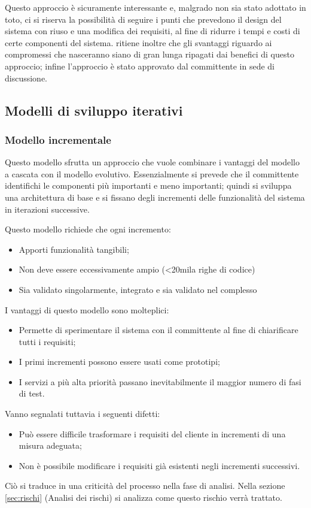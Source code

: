 Questo approccio è sicuramente interessante e, malgrado non sia stato adottato in toto, ci si riserva la possibilità di seguire i punti che prevedono il design del sistema con riuso e una modifica dei requisiti, al fine di ridurre i tempi e costi di certe componenti del sistema. \hx{} ritiene inoltre che gli svantaggi riguardo ai compromessi che nasceranno siano di gran lunga ripagati dai benefici di questo approccio; infine l'approccio è stato approvato dal committente in sede di discussione.

\subsection{Modelli di sviluppo iterativi}

\subsubsection{Modello incrementale}
Questo modello sfrutta un approccio che vuole combinare i vantaggi del modello a cascata con il modello evolutivo. Essenzialmente si prevede che il committente identifichi le componenti più importanti e meno importanti; quindi si sviluppa una architettura di base e si fissano degli incrementi delle funzionalità del sistema in iterazioni successive.

Questo modello richiede che ogni incremento:
\begin{itemize}
	\item Apporti funzionalità tangibili;
	\item Non deve essere eccessivamente ampio (<20mila righe di codice)
	\item Sia validato singolarmente, integrato e sia validato nel complesso
\end{itemize}

I vantaggi di questo modello sono molteplici:
\begin{itemize}
	\item Permette di sperimentare il sistema con il committente al fine di chiarificare tutti i requisiti;
	\item I primi incrementi possono essere usati come prototipi;
	\item I servizi a più alta priorità passano inevitabilmente il maggior numero di fasi di test.
\end{itemize}

Vanno segnalati tuttavia i seguenti difetti:
\begin{itemize}
\item Può essere difficile trasformare i requisiti del cliente in incrementi di una misura adeguata;
\item Non è possibile modificare i requisiti già esistenti negli incrementi successivi.
\end{itemize}
Ciò si traduce in una criticità del processo nella fase di analisi. Nella sezione {\ref{sec:rischi}} (Analisi dei rischi) si analizza come questo rischio verrà trattato.

